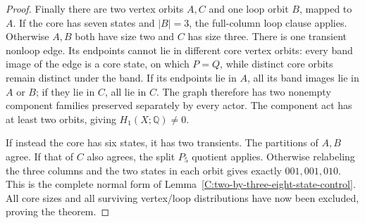 \begin{proof}
Finally there are two vertex orbits $A,C$ and one loop
orbit $B$, mapped to $A$.  If the core has seven states
and $|B|=3$, the full-column loop clause applies.  Otherwise
$A,B$ both have size two and $C$ has size three.
There is one transient nonloop edge.  Its endpoints cannot
lie in different core vertex orbits: every band image of
the edge is a core state, on which $P=Q$, while distinct
core orbits remain distinct under the band.  If its
endpoints lie in $A$, all its band images lie in $A$ or
$B$; if they lie in $C$, all lie in $C$.  The graph
therefore has two nonempty component families preserved
separately by every actor.  The component act has at
least two orbits, giving $H_1(X;\mathbb Q)\ne0$.

If instead the core has six states, it has two transients.
The partitions of $A,B$ agree.  If that of $C$ also agrees,
the split $P_5$ quotient applies.  Otherwise relabeling the
three columns and the two states in each orbit gives
exactly $001,001,010$.  This is the complete normal form
of Lemma~\ref{C:two-by-three-eight-state-control}.
All core sizes and all surviving vertex/loop distributions
have now been excluded, proving the theorem.
\end{proof}
